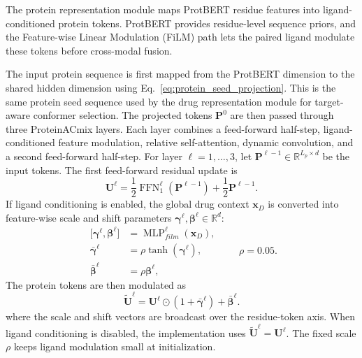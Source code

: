 The protein representation module maps ProtBERT residue features into ligand-conditioned
protein tokens. ProtBERT provides residue-level sequence priors, and the
Feature-wise Linear Modulation (FiLM) path \citep{perez2018film} lets the paired
ligand modulate these tokens before cross-modal fusion.

The input protein sequence is first mapped from the ProtBERT dimension to the
shared hidden dimension using Eq.~\ref{eq:protein_seed_projection}. This is the
same protein seed sequence used by the drug representation module for target-aware
conformer selection. The projected tokens $\mathbf{P}^{0}$ are then passed through
three ProteinACmix layers. Each layer
combines a feed-forward half-step, ligand-conditioned feature modulation,
relative self-attention, dynamic convolution, and a second feed-forward
half-step. For layer $\ell=1,\ldots,3$, let
$\mathbf{P}^{\ell-1}\in\mathbb{R}^{L_p\times d}$ be the input tokens. The first
feed-forward residual update is
\begin{equation}
  \mathbf{U}^{\ell}
  =
  \frac{1}{2}\operatorname{FFN}^{\ell}_{1}(\mathbf{P}^{\ell-1})
  +
  \frac{1}{2}\mathbf{P}^{\ell-1}.
  \label{eq:protein_ffn_half_1}
\end{equation}
If ligand conditioning is enabled, the global drug context $\mathbf{x}_D$ is
converted into feature-wise scale and shift parameters
$\boldsymbol{\gamma}^{\ell},\boldsymbol{\beta}^{\ell}\in\mathbb{R}^{d}$:
\begin{equation}
\begin{aligned}
  \bigl[\boldsymbol{\gamma}^{\ell},\boldsymbol{\beta}^{\ell}\bigr]
  &= \operatorname{MLP}^{\ell}_{film}(\mathbf{x}_D),\\
  \bar{\boldsymbol{\gamma}}^{\ell}
  &= \rho\tanh(\boldsymbol{\gamma}^{\ell}),\\
  \bar{\boldsymbol{\beta}}^{\ell}
  &= \rho\boldsymbol{\beta}^{\ell},
\end{aligned}
\qquad \rho=0.05.
\label{eq:film_params}
\end{equation}
The protein tokens are then modulated as
\begin{equation}
  \tilde{\mathbf{U}}^{\ell}
  =
  \mathbf{U}^{\ell}\odot
  (1+\bar{\boldsymbol{\gamma}}^{\ell})
  +\bar{\boldsymbol{\beta}}^{\ell}.
  \label{eq:ligand_film}
\end{equation}
where the scale and shift vectors are broadcast over the residue-token axis.
When ligand conditioning is disabled, the implementation uses
$\tilde{\mathbf{U}}^{\ell}=\mathbf{U}^{\ell}$. The fixed scale $\rho$ keeps
ligand modulation small at initialization.

